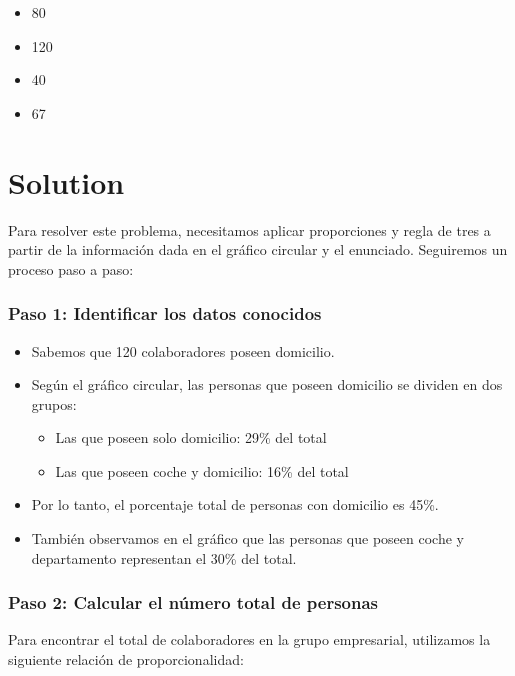 \documentclass[
]{article}
\providecommand{\tightlist}{%
  \setlength{\itemsep}{0pt}\setlength{\parskip}{0pt}}
\begin{document}
\begin{itemize}
\tightlist
\item
  80
\item
  120
\item
  40
\item
  67
\end{itemize}

\section{Solution}\label{solution}

Para resolver este problema, necesitamos aplicar proporciones y regla de
tres a partir de la información dada en el gráfico circular y el
enunciado. Seguiremos un proceso paso a paso:

\subsubsection{Paso 1: Identificar los datos
conocidos}\label{paso-1-identificar-los-datos-conocidos}

\begin{itemize}
\tightlist
\item
  Sabemos que 120 colaboradores poseen domicilio.
\item
  Según el gráfico circular, las personas que poseen domicilio se
  dividen en dos grupos:

  \begin{itemize}
  \tightlist
  \item
    Las que poseen solo domicilio: 29\% del total
  \item
    Las que poseen coche y domicilio: 16\% del total
  \end{itemize}
\item
  Por lo tanto, el porcentaje total de personas con domicilio es 45\%.
\item
  También observamos en el gráfico que las personas que poseen coche y
  departamento representan el 30\% del total.
\end{itemize}

\subsubsection{Paso 2: Calcular el número total de
personas}\label{paso-2-calcular-el-nuxfamero-total-de-personas}

Para encontrar el total de colaboradores en la grupo empresarial,
utilizamos la siguiente relación de proporcionalidad:
\end{document}
